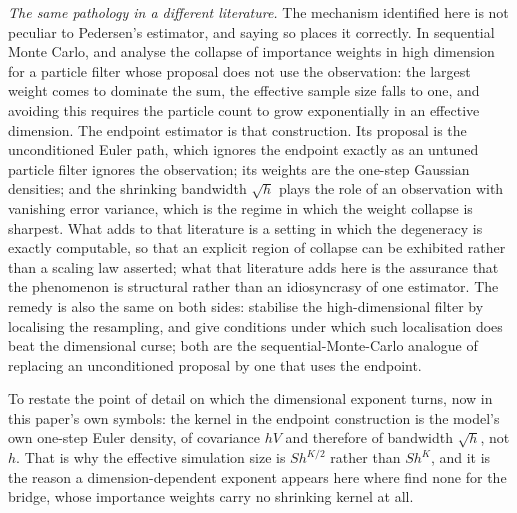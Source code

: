 \documentclass[11pt]{article}
\theoremstyle{definition}
\begin{document}
\emph{The same pathology in a different literature.} The mechanism identified here is not peculiar to Pedersen's estimator, and saying so places it correctly. In sequential Monte Carlo, \citet{BengtssonBickelLi2008} and \citet{SnyderEtAl2008} analyse the collapse of importance weights in high dimension for a particle filter whose proposal does not use the observation: the largest weight comes to dominate the sum, the effective sample size falls to one, and avoiding this requires the particle count to grow exponentially in an effective dimension. The endpoint estimator is that construction. Its proposal is the unconditioned Euler path, which ignores the endpoint exactly as an untuned particle filter ignores the observation; its weights are the one-step Gaussian densities; and the shrinking bandwidth $\sqrt h$ plays the role of an observation with vanishing error variance, which is the regime in which the weight collapse is sharpest. What  adds to that literature is a setting in which the degeneracy is exactly computable, so that an explicit region of collapse can be exhibited rather than a scaling law asserted; what that literature adds here is the assurance that the phenomenon is structural rather than an idiosyncrasy of one estimator. The remedy is also the same on both sides: \citet{BeskosEtAl2017} stabilise the high-dimensional filter by localising the resampling, and \citet{RebeschiniVanHandel2015} give conditions under which such localisation does beat the dimensional curse; both are the sequential-Monte-Carlo analogue of replacing an unconditioned proposal by one that uses the endpoint.

To restate the point of detail on which the dimensional exponent turns, now in this paper's own symbols: the kernel in the endpoint construction is the model's own one-step Euler density, of covariance $hV$ and therefore of bandwidth $\sqrt h$, not $h$. That is why the effective simulation size is $Sh^{K/2}$ rather than $Sh^K$, and it is the reason a dimension-dependent exponent appears here where \citet{StramerYan2007a} find none for the bridge, whose importance weights carry no shrinking kernel at all.
\end{document}
